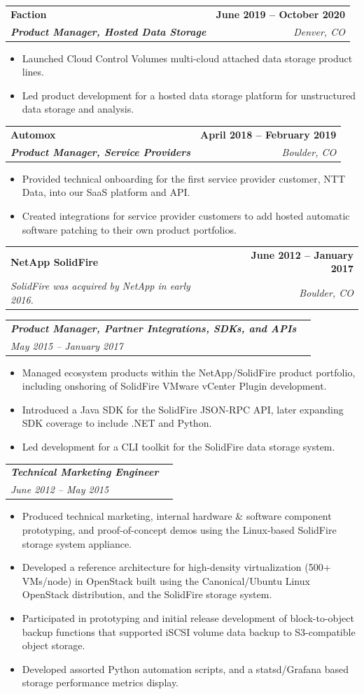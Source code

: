 \documentclass[letterpaper,11pt]{article}
\makeatletter
\newcommand{\resumeItem}[1]{
  \item\footnotesize{
    {#1 \vspace{-2pt}}
  }
}
\newcommand{\resumeSubheading}[4]{
  \vspace{-2pt}\item
    \begin{tabular*}{0.97\textwidth}[t]{l@{\extracolsep{\fill}}r}
      \textbf{\small#1} & \textbf{\small#2} \\
      \textit{\small#3} & \textit{\small #4} \\
    \end{tabular*}\vspace{-7pt}
}
\newcommand{\resumeCompanyHeading}[4]{
  \vspace{-2pt}\item
    \begin{tabular*}{0.97\textwidth}[t]{l@{\extracolsep{\fill}}r}
      \textbf{\small#1} & \textbf{\small#2} \\
      \textbf{\textit{\small#3}} & \textit{\small #4} \\
    \end{tabular*}\vspace{-7pt}
}
\newcommand{\resumeSubSubheading}[2]{
    \item
    \begin{tabular*}{0.97\textwidth}[t]{l@{\extracolsep{\fill}}r}
      \textbf{\textit{\small#1}} & \\
      \textit{\small#2} & \\
    \end{tabular*}\vspace{-7pt}
}
\newcommand{\resumeItemListStart}{\begin{itemize}}
\newcommand{\resumeItemListEnd}{\end{itemize}\vspace{-5pt}}
\makeatother
\begin{document}
    \resumeCompanyHeading
      {Faction}{June 2019 -- October 2020}
      {Product Manager, Hosted Data Storage}{Denver, CO}
      \resumeItemListStart
        \resumeItem{Launched Cloud Control Volumes multi-cloud attached data storage product lines.}
        \resumeItem{Led product development for a hosted data storage platform for unstructured data storage and analysis.}
      \resumeItemListEnd

    \resumeCompanyHeading
      {Automox}{April 2018 -- February 2019}
      {Product Manager, Service Providers}{Boulder, CO}
      \resumeItemListStart
        \resumeItem{Provided technical onboarding for the first service provider customer, NTT Data, into our SaaS platform and API.}
        \resumeItem{Created integrations for service provider customers to add hosted automatic software patching to their own product portfolios.}
      \resumeItemListEnd

    \resumeSubheading
      {NetApp SolidFire}{June 2012 -- January 2017}
      {SolidFire was acquired by NetApp in early 2016.}{Boulder, CO}

    \resumeSubSubheading
      {Product Manager, Partner Integrations, SDKs, and APIs}{May 2015 -- January 2017}
      \resumeItemListStart
        \resumeItem{Managed ecosystem products within the NetApp/SolidFire product portfolio, including onshoring of SolidFire VMware vCenter Plugin development.}
        \resumeItem{Introduced a Java SDK for the SolidFire JSON-RPC API, later expanding SDK coverage to include .NET and Python.}
        \resumeItem{Led development for a CLI toolkit for the SolidFire data storage system.}
      \resumeItemListEnd

    \resumeSubSubheading
      {Technical Marketing Engineer}{June 2012 -- May 2015}
      \resumeItemListStart
        \resumeItem{Produced technical marketing, internal hardware \& software component prototyping, and proof-of-concept demos using the Linux-based SolidFire storage system appliance.}
        \resumeItem{Developed a reference architecture for high-density virtualization (500+ VMs/node) in OpenStack built using the Canonical/Ubuntu Linux OpenStack distribution, and the SolidFire storage system.}
        \resumeItem{Participated in prototyping and initial release development of block-to-object backup functions that supported iSCSI volume data backup to S3-compatible object storage.}
        \resumeItem{Developed assorted Python automation scripts, and a statsd/Grafana based storage performance metrics display.}
      \resumeItemListEnd
\end{document}

